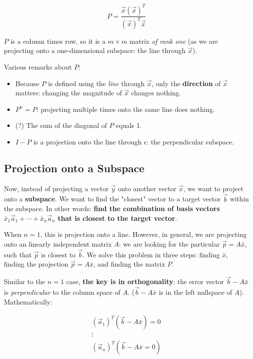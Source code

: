 \documentclass{article}
\begin{document}
\[P = \frac{\vec{x} (\vec{x})^T}{(\vec{x})^T \vec{x}}\]

$P$ is a column times row, so it is a $m \times m$ matrix \textit{of rank one} (as we are projecting onto a one-dimensional subspace: the line through $\vec{x}$).

Various remarks about $P$:
\begin{itemize}
    \item Because $P$ is defined using the \textit{line} through $\vec{x}$, only the \textbf{direction} of $\vec{x}$ matters: changing the magnitude of $\vec{x}$ changes nothing.
    \item $P^n = P$: projecting multiple times onto the same line does nothing.
    \item (?) The sum of the diagonal of $P$ equals 1.
    \item $I - P$ is a projection onto the line through $\epsilon$: the perpendicular subspace.
\end{itemize}

\subsection{Projection onto a Subspace}
Now, instead of projecting a vector $\vec{y}$ onto another vector $\vec{x}$, we want to project onto a \textbf{subspace}.
We want to find the "closest" vector to a target vector $\vec{b}$ within the subspace.
In other words: \textbf{find the combination of basis vectors $\bar{x}_1 \vec{a}_1 + \cdots + \bar{x}_n \vec{a}_n$ that is closest to the target vector}.

When $n = 1$, this is projection onto a line.
However, in general, we are projecting onto an linearly independent matrix $A$: we are looking for the particular $\vec{p} = A \bar{x}$, such that $\vec{p}$ is closest to $\vec{b}$.
We solve this problem in three steps: finding $\bar{x}$, finding the projection $\vec{p} = A \bar{x}$, and finding the matrix $P$.

Similar to the $n = 1$ case, \textbf{the key is in orthogonality}: the error vector $\vec{b} - A \bar{x}$ is \textit{perpendicular} to the column space of $A$. ($\vec{b} - A \bar{x}$ is in the left nullspace of $A$).
Mathematically:

\[\begin{matrix}
    (\vec{a}_1)^T (\vec{b} - A \bar{x}) = 0 \\
    \vdots \\
    (\vec{a}_n)^T (\vec{b} - A \bar{x} = 0)
\end{matrix}\]
\end{document}
